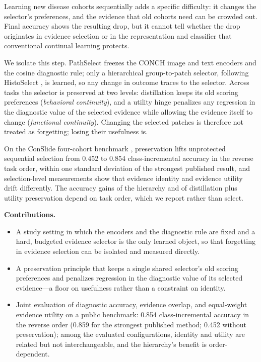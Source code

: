 \documentclass{article}
\begin{document}
Learning new disease cohorts sequentially adds a specific difficulty: it changes the selector's preferences, and the evidence that old cohorts need can be crowded out. Final accuracy shows the resulting drop, but it cannot tell whether the drop originates in evidence selection or in the representation and classifier that conventional continual learning protects.

We isolate this step. PathSelect freezes the CONCH image and text encoders \cite{lu2024conch} and the cosine diagnostic rule; only a hierarchical group-to-patch selector, following HistoSelect \cite{huang2026histoselect}, is learned, so any change in outcome traces to the selector. Across tasks the selector is preserved at two levels: distillation keeps its old scoring preferences (\emph{behavioral continuity}), and a utility hinge penalizes any regression in the diagnostic value of the selected evidence while allowing the evidence itself to change (\emph{functional continuity}). Changing the selected patches is therefore not treated as forgetting; losing their usefulness is.

On the ConSlide four-cohort benchmark \cite{huang2023conslide}, preservation lifts unprotected sequential selection from 0.452 to 0.854 class-incremental accuracy in the reverse task order, within one standard deviation of the strongest published result, and selection-level measurements show that evidence identity and evidence utility drift differently. The accuracy gains of the hierarchy and of distillation plus utility preservation depend on task order, which we report rather than select.

\textbf{Contributions.}
\begin{itemize}
    \item A study setting in which the encoders and the diagnostic rule are fixed and a hard, budgeted evidence selector is the only learned object, so that forgetting in evidence selection can be isolated and measured directly.
    \item A preservation principle that keeps a single shared selector's old scoring preferences and penalizes regression in the diagnostic value of its selected evidence---a floor on usefulness rather than a constraint on identity.
    \item Joint evaluation of diagnostic accuracy, evidence overlap, and equal-weight evidence utility on a public benchmark: 0.854 class-incremental accuracy in the reverse order (0.859 for the strongest published method; 0.452 without preservation); among the evaluated configurations, identity and utility are related but not interchangeable, and the hierarchy's benefit is order-dependent.
\end{itemize}
\end{document}
